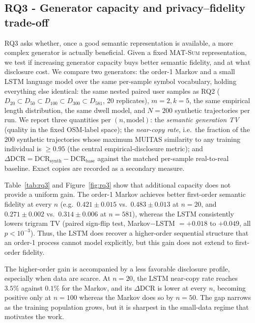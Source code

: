 \documentclass[sigconf,nonacm]{acmart}
\begin{document}
\subsection{RQ3 - Generator capacity and privacy–fidelity trade-off}
\label{sec:rq3}

RQ3 asks whether, once a good semantic representation is available, a more complex generator is actually beneficial.
Given a fixed \textsc{MAT-Sum} representation, we test if increasing generator capacity buys better semantic fidelity, and at what disclosure cost. We compare two generators: the order-1 Markov and a small LSTM language model over the same per-sample symbol vocabulary, holding everything else identical: the same nested paired user samples as RQ2
($D_{20}\!\subset\!D_{50}\!\subset\!D_{100}\!\subset\!D_{300}\!\subset\!D_{581}$, 20 replicates),
$m{=}2,k{=}5$, the same empirical length distribution, the same dwell model, and $N{=}200$ synthetic
trajectories per run. We report three quantities per $(n,\text{model})$: the \emph{semantic
generation TV} (quality in the fixed OSM-label space); the \emph{near-copy rate}, i.e.\ the fraction
of the $200$ synthetic trajectories whose maximum MUITAS similarity to any training individual is
$\ge0.95$ (the central empirical-disclosure metric); and
$\Delta\mathrm{DCR}=\mathrm{DCR}_{\text{synth}}-\mathrm{DCR}_{\text{base}}$ against the matched
per-sample real-to-real baseline. Exact copies are recorded as a secondary measure.

Table~\ref{tab:rq3} and Figure~\ref{fig:rq3} show that additional capacity does not provide a uniform gain. The order-1 Markov achieves better first-order semantic fidelity at every $n$ (e.g.\ $0.421\pm0.015$ vs.\ $0.483\pm0.013$ at $n{=}20$, and $0.271\pm0.002$ vs.\ $0.314\pm0.006$ at $n{=}581$), whereas the LSTM consistently lowers trigram TV (paired sign-flip test, Markov$-$LSTM $=+0.018$ to $+0.049$, all $p<10^{-3}$). Thus, the LSTM does recover a higher-order sequential structure that an order-1 process cannot model explicitly, but this gain does not extend to first-order fidelity.

The higher-order gain is accompanied by a less favorable disclosure profile, especially when data are scarce. At $n{=}20$, the LSTM near-copy rate reaches $3.5\%$ against $0.1\%$ for the Markov, and its $\Delta\mathrm{DCR}$ is lower at every $n$, becoming positive only at $n{=}100$ whereas the Markov does so by $n{=}50$. The gap narrows as the training population grows, but it is sharpest in the small-data regime that motivates the work.
\end{document}

